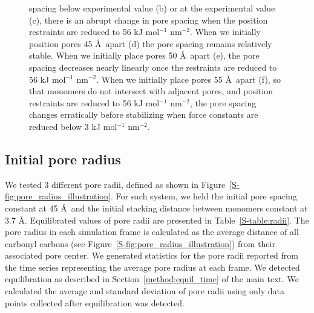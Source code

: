 \begin{figure}[!htb]
{	spacing below experimental value (b) or at the experimental value (c), there
	is an abrupt change in pore spacing when the position restraints are reduced to 56 kJ
	mol$^{-1}$ nm$^{-2}$. When we initially position pores 45 \AA~apart (d) the pore spacing
	remains relatively stable. When we initially place pores 50 \AA~apart (e), the pore
	spacing decreases nearly linearly once the restraints are reduced to 56 kJ
	mol$^{-1}$ nm$^{-2}$. When we initially place pores 55 \AA~apart (f), so that monomers
	do not intersect with adjacent pores, and position restraints are reduced to 56
	kJ mol$^{-1}$ nm$^{-2}$, the pore spacing changes erratically before stabilizing
	when force constants are reduced below 3 kJ mol$^{-1}$ nm$^{-2}$. } 
	\label{S-fig:p2p}
  \end{figure}

  \subsection{Initial pore radius}\label{S-section:initial_pore_radius}

  We tested 3 different pore radii, defined as shown in
  Figure~\ref{S-fig:pore_radius_illustration}. For each system, we held the initial
  pore spacing constant at 45 \AA~and the initial stacking distance between monomers
  constant at 3.7 \AA. Equilibrated values of pore radii are presented in
  Table~\ref{S-table:radii}. The pore radius in each simulation frame is calculated
  as the average distance of all carbonyl carbons (see
  Figure~\ref{S-fig:pore_radius_illustration}) from their associated pore center.
  We generated statistics for the pore radii reported from the time series
  representing the average pore radius at each frame. We detected equilibration
  as described in Section~\ref{method:equil_time} of the main text. We 
  calculated the average and standard deviation of pore radii using only data 
  points collected after equilibration was detected.

